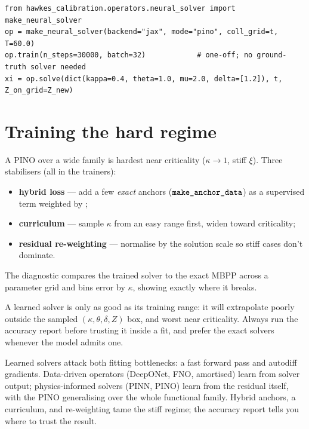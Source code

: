 \begin{lstlisting}[caption={JAX/TensorFlow PINN or PINO behind one interface (from \code{neural\_solver.py}).}]
from hawkes_calibration.operators.neural_solver import make_neural_solver
op = make_neural_solver(backend="jax", mode="pino", coll_grid=t, T=60.0)
op.train(n_steps=30000, batch=32)            # one-off; no ground-truth solver needed
xi = op.solve(dict(kappa=0.4, theta=1.0, mu=2.0, delta=[1.2]), t, Z_on_grid=Z_new)
\end{lstlisting}

\section{Training the hard regime}

A PINO over a wide family is hardest near criticality ($\kappa\to1$, stiff $\xi$).
Three stabilisers (all in the trainers):

\begin{itemize}[leftmargin=1.4em]
\item \textbf{hybrid loss} --- add a few \emph{exact} anchors
($\texttt{make\_anchor\_data}$) as a supervised term weighted by ;
\item \textbf{curriculum} --- sample $\kappa$ from an easy range first, widen toward
criticality;
\item \textbf{residual re-weighting} --- normalise by the solution scale so stiff
cases don't dominate.
\end{itemize}
The diagnostic  compares the trained solver to the
exact MBPP across a parameter grid and bins error by $\kappa$, showing exactly where
it breaks.

\begin{pitfall}
A learned solver is only as good as its training range: it will extrapolate poorly
outside the sampled $(\kappa,\theta,\delta,Z)$ box, and worst near criticality.
Always run the accuracy report before trusting it inside a fit, and prefer the exact
solvers whenever the model admits one.
\end{pitfall}

\begin{recap}
Learned solvers attack both fitting bottlenecks: a fast forward pass and autodiff
gradients. Data-driven operators (DeepONet, FNO, amortised) learn from solver
output; physics-informed solvers (PINN, PINO) learn from the residual itself, with
the PINO generalising over the whole functional family. Hybrid anchors, a
curriculum, and re-weighting tame the stiff regime; the accuracy report tells you
where to trust the result.
\end{recap}

